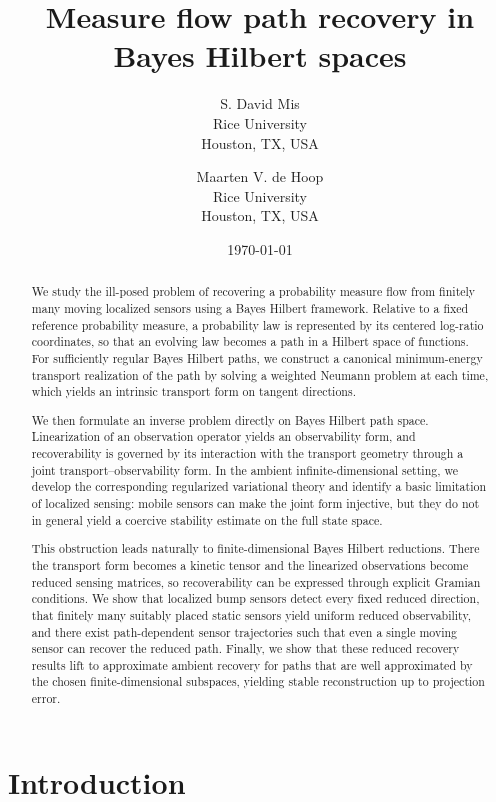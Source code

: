 \documentclass{article}
\title{Measure flow path recovery in Bayes Hilbert spaces}
\author{
S. David Mis\\
Rice University\\
Houston, TX, USA
\and
Maarten V. de Hoop\\
Rice University\\
Houston, TX, USA
}
\date{\today}
\theoremstyle{definition}
\begin{document}
\maketitle


\begin{abstract}
    We study the ill-posed problem of recovering a probability measure flow from finitely many moving localized sensors using a Bayes Hilbert framework.
    Relative to a fixed reference probability measure, a probability law is represented by its centered log-ratio coordinates, so that an evolving law becomes a path in a Hilbert space of functions.
    For sufficiently regular Bayes Hilbert paths, we construct a canonical minimum-energy transport realization of the path by solving a weighted Neumann problem at each time, which yields an intrinsic transport form on tangent directions.

    We then formulate an inverse problem directly on Bayes Hilbert path space.
    Linearization of an observation operator yields an observability form, and recoverability is governed by its interaction with the transport geometry through a joint transport--observability form.
    In the ambient infinite-dimensional setting, we develop the corresponding regularized variational theory and identify a basic limitation of localized sensing: mobile sensors can make the joint form injective, but they do not in general yield a coercive stability estimate on the full state space.

    This obstruction leads naturally to finite-dimensional Bayes Hilbert reductions.
    There the transport form becomes a kinetic tensor and the linearized observations become reduced sensing matrices, so recoverability can be expressed through explicit Gramian conditions.
    We show that localized bump sensors detect every fixed reduced direction, that finitely many suitably placed static sensors yield uniform reduced observability, and there exist path-dependent sensor trajectories such that even a single moving sensor can recover the reduced path.
    Finally, we show that these reduced recovery results lift to approximate ambient recovery for paths that are well approximated by the chosen finite-dimensional subspaces, yielding stable reconstruction up to projection error.
\end{abstract}
\tableofcontents


\section{Introduction}
\end{document}
